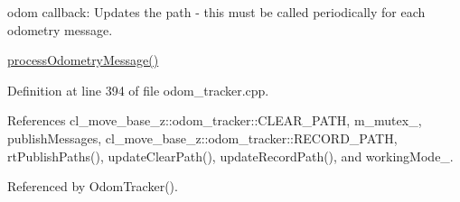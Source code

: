 odom callback\+: Updates the path -\/ this must be called periodically for each odometry message. 

\hyperlink{classcl__move__base__z_1_1odom__tracker_1_1OdomTracker_a12c5a839cfde2e8f2f55a5e0c9647b18}{process\+Odometry\+Message()} 

Definition at line 394 of file odom\+\_\+tracker.\+cpp.



References cl\+\_\+move\+\_\+base\+\_\+z\+::odom\+\_\+tracker\+::\+C\+L\+E\+A\+R\+\_\+\+P\+A\+TH, m\+\_\+mutex\+\_\+, publish\+Messages, cl\+\_\+move\+\_\+base\+\_\+z\+::odom\+\_\+tracker\+::\+R\+E\+C\+O\+R\+D\+\_\+\+P\+A\+TH, rt\+Publish\+Paths(), update\+Clear\+Path(), update\+Record\+Path(), and working\+Mode\+\_\+.



Referenced by Odom\+Tracker().



